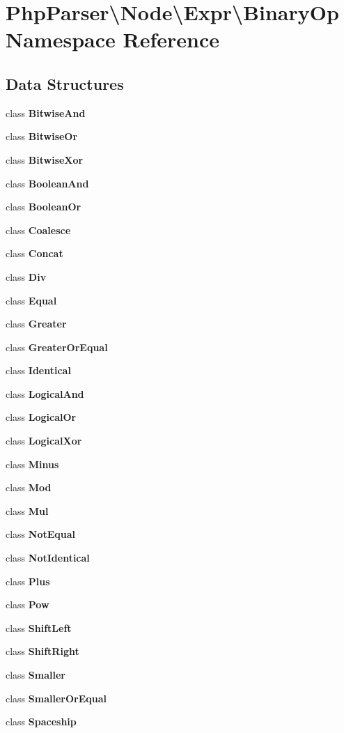\section{Php\+Parser\textbackslash{}Node\textbackslash{}Expr\textbackslash{}Binary\+Op Namespace Reference}
\label{namespace_php_parser_1_1_node_1_1_expr_1_1_binary_op}
\subsection*{Data Structures}
\begin{DoxyCompactItemize}
\item 
class {\bf Bitwise\+And}
\item 
class {\bf Bitwise\+Or}
\item 
class {\bf Bitwise\+Xor}
\item 
class {\bf Boolean\+And}
\item 
class {\bf Boolean\+Or}
\item 
class {\bf Coalesce}
\item 
class {\bf Concat}
\item 
class {\bf Div}
\item 
class {\bf Equal}
\item 
class {\bf Greater}
\item 
class {\bf Greater\+Or\+Equal}
\item 
class {\bf Identical}
\item 
class {\bf Logical\+And}
\item 
class {\bf Logical\+Or}
\item 
class {\bf Logical\+Xor}
\item 
class {\bf Minus}
\item 
class {\bf Mod}
\item 
class {\bf Mul}
\item 
class {\bf Not\+Equal}
\item 
class {\bf Not\+Identical}
\item 
class {\bf Plus}
\item 
class {\bf Pow}
\item 
class {\bf Shift\+Left}
\item 
class {\bf Shift\+Right}
\item 
class {\bf Smaller}
\item 
class {\bf Smaller\+Or\+Equal}
\item 
class {\bf Spaceship}
\end{DoxyCompactItemize}
